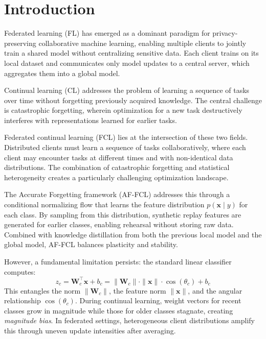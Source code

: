 \documentclass[conference]{IEEEtran}
\begin{document}
\section{Introduction}

Federated learning (FL) has emerged as a dominant paradigm for privacy-preserving collaborative machine learning, enabling multiple clients to jointly train a shared model without centralizing sensitive data. Each client trains on its local dataset and communicates only model updates to a central server, which aggregates them into a global model.

Continual learning (CL) addresses the problem of learning a sequence of tasks over time without forgetting previously acquired knowledge. The central challenge is catastrophic forgetting, wherein optimization for a new task destructively interferes with representations learned for earlier tasks.

Federated continual learning (FCL) lies at the intersection of these two fields. Distributed clients must learn a sequence of tasks collaboratively, where each client may encounter tasks at different times and with non-identical data distributions. The combination of catastrophic forgetting and statistical heterogeneity creates a particularly challenging optimization landscape.

The Accurate Forgetting framework (AF-FCL) addresses this through a conditional normalizing flow that learns the feature distribution $p(\mathbf{x} \mid y)$ for each class. By sampling from this distribution, synthetic replay features are generated for earlier classes, enabling rehearsal without storing raw data. Combined with knowledge distillation from both the previous local model and the global model, AF-FCL balances plasticity and stability.

However, a fundamental limitation persists: the standard linear classifier computes:
\begin{equation}
z_c = \mathbf{W}_c^\top \mathbf{x} + b_c = \|\mathbf{W}_c\| \cdot \|\mathbf{x}\| \cdot \cos(\theta_c) + b_c
\end{equation}
This entangles the norm $\|\mathbf{W}_c\|$, the feature norm $\|\mathbf{x}\|$, and the angular relationship $\cos(\theta_c)$. During continual learning, weight vectors for recent classes grow in magnitude while those for older classes stagnate, creating \textit{magnitude bias}. In federated settings, heterogeneous client distributions amplify this through uneven update intensities after averaging.
\end{document}
